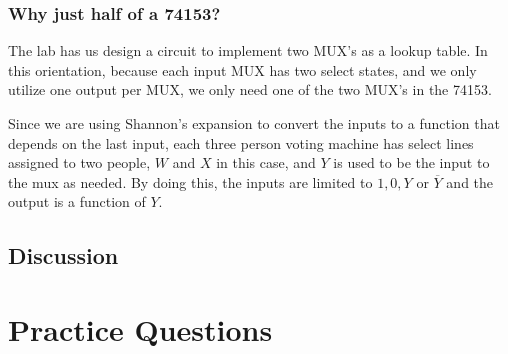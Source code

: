 \documentclass[12pt]{article}
\begin{document}
\subsubsection*{Why just half of a 74153?}
The lab has us design a circuit to implement two MUX's as a lookup table. In
this orientation, because each input MUX has two select states, and we only
utilize one output per MUX, we only need one of the two MUX's in the 74153.

Since we are using Shannon's expansion to convert the inputs to a function that
depends on the last input, each three person voting machine has select lines
assigned to two people, \(W\) and \(X\) in this case, and \(Y\) is used to be the
input to the mux as needed. By doing this, the inputs are limited to \(1, 0, Y
\) or  \(\overline{Y}\) and the output is a function of \(Y\).
\subsection*{Discussion}
\section*{Practice Questions}
\end{document}
